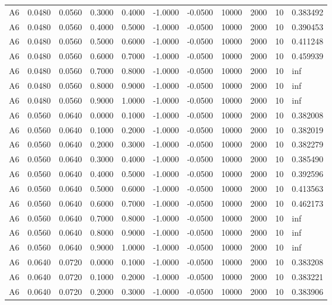 \documentclass{article}
\begin{document}
\begin{longtable}{l r r r r r r r r r l}
A6 & 0.0480 & 0.0560 & 0.3000 & 0.4000 & -1.0000 & -0.0500 & 10000 & 2000 & 10 & 0.383492 \\
A6 & 0.0480 & 0.0560 & 0.4000 & 0.5000 & -1.0000 & -0.0500 & 10000 & 2000 & 10 & 0.390453 \\
A6 & 0.0480 & 0.0560 & 0.5000 & 0.6000 & -1.0000 & -0.0500 & 10000 & 2000 & 10 & 0.411248 \\
A6 & 0.0480 & 0.0560 & 0.6000 & 0.7000 & -1.0000 & -0.0500 & 10000 & 2000 & 10 & 0.459939 \\
A6 & 0.0480 & 0.0560 & 0.7000 & 0.8000 & -1.0000 & -0.0500 & 10000 & 2000 & 10 & inf \\
A6 & 0.0480 & 0.0560 & 0.8000 & 0.9000 & -1.0000 & -0.0500 & 10000 & 2000 & 10 & inf \\
A6 & 0.0480 & 0.0560 & 0.9000 & 1.0000 & -1.0000 & -0.0500 & 10000 & 2000 & 10 & inf \\
A6 & 0.0560 & 0.0640 & 0.0000 & 0.1000 & -1.0000 & -0.0500 & 10000 & 2000 & 10 & 0.382008 \\
A6 & 0.0560 & 0.0640 & 0.1000 & 0.2000 & -1.0000 & -0.0500 & 10000 & 2000 & 10 & 0.382019 \\
A6 & 0.0560 & 0.0640 & 0.2000 & 0.3000 & -1.0000 & -0.0500 & 10000 & 2000 & 10 & 0.382279 \\
A6 & 0.0560 & 0.0640 & 0.3000 & 0.4000 & -1.0000 & -0.0500 & 10000 & 2000 & 10 & 0.385490 \\
A6 & 0.0560 & 0.0640 & 0.4000 & 0.5000 & -1.0000 & -0.0500 & 10000 & 2000 & 10 & 0.392596 \\
A6 & 0.0560 & 0.0640 & 0.5000 & 0.6000 & -1.0000 & -0.0500 & 10000 & 2000 & 10 & 0.413563 \\
A6 & 0.0560 & 0.0640 & 0.6000 & 0.7000 & -1.0000 & -0.0500 & 10000 & 2000 & 10 & 0.462173 \\
A6 & 0.0560 & 0.0640 & 0.7000 & 0.8000 & -1.0000 & -0.0500 & 10000 & 2000 & 10 & inf \\
A6 & 0.0560 & 0.0640 & 0.8000 & 0.9000 & -1.0000 & -0.0500 & 10000 & 2000 & 10 & inf \\
A6 & 0.0560 & 0.0640 & 0.9000 & 1.0000 & -1.0000 & -0.0500 & 10000 & 2000 & 10 & inf \\
A6 & 0.0640 & 0.0720 & 0.0000 & 0.1000 & -1.0000 & -0.0500 & 10000 & 2000 & 10 & 0.383208 \\
A6 & 0.0640 & 0.0720 & 0.1000 & 0.2000 & -1.0000 & -0.0500 & 10000 & 2000 & 10 & 0.383221 \\
A6 & 0.0640 & 0.0720 & 0.2000 & 0.3000 & -1.0000 & -0.0500 & 10000 & 2000 & 10 & 0.383906 \\

\end{longtable}
\end{document}
